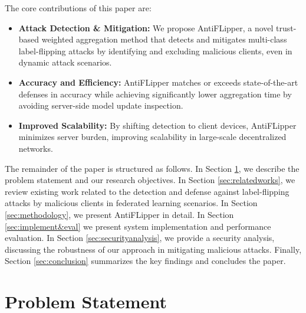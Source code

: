 \documentclass[conference]{IEEEtran}
\begin{document}
The core contributions of this paper are:

\begin{itemize}
   \item \textbf{Attack Detection \& Mitigation:} We propose AntiFLipper, a novel trust-based weighted aggregation method that detects and mitigates multi-class label-flipping attacks by identifying and excluding malicious clients, even in dynamic attack scenarios.

   \item \textbf{Accuracy and Efficiency:} AntiFLipper matches or exceeds state-of-the-art defenses in accuracy while achieving significantly lower aggregation time by avoiding server-side model update inspection.

   \item \textbf{Improved Scalability:} By shifting detection to client devices, AntiFLipper minimizes server burden, improving scalability in large-scale decentralized networks.
    
\end{itemize}


    The remainder of the paper is structured as follows. In Section \ref{sec:problem Statement}, we describe the problem statement and our research objectives. In Section \ref{sec:relatedworks}, we review existing work related to the detection and defense against label-flipping attacks by malicious clients in federated learning scenarios. In Section \ref{sec:methodology}, we present AntiFLipper in detail.  In Section \ref{sec:implement&eval} we present system implementation and performance evaluation. In Section \ref{sec:securityanalysis}, we provide a security analysis, discussing the robustness of our approach in mitigating malicious attacks.  Finally, Section \ref{sec:conclusion} summarizes the key findings and concludes the paper.


\section{Problem Statement}
\label{sec:problem Statement}
\end{document}
